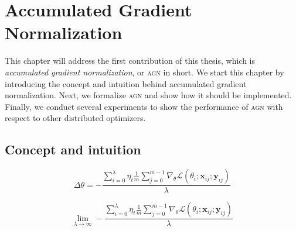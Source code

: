 %
%
%

\chapter{Accumulated Gradient Normalization}
\label{chapter:accumulated_gradient_normalization}

This chapter will address the first contribution of this thesis, which is \emph{accumulated gradient normalization}, or \textsc{agn} in short. We start this chapter by introducing the concept and intuition behind accumulated gradient normalization. Next, we formalize \textsc{agn} and show how it should be implemented. Finally, we conduct several experiments to show the performance of \textsc{agn} with respect to other distributed optimizers.

\section{Concept and intuition}
\label{sec:agn_concept}

\begin{equation}
  \label{eq:accumulated_gradient_normalization}
  \Delta\theta = -\frac{\sum_{i = 0}^\lambda \eta_t \frac{1}{m}\sum_{j = 0}^{m - 1} \nabla_\theta \mathcal{L}(\theta_i;\textbf{x}_{ij};\textbf{y}_{ij})}{\lambda}
\end{equation}

\begin{equation}
  \lim_{\lambda \to \infty} -\frac{\sum_{i = 0}^\lambda \eta_t \frac{1}{m}\sum_{j = 0}^{m - 1} \nabla_\theta \mathcal{L}(\theta_i;\textbf{x}_{ij};\textbf{y}_{ij})}{\lambda}
\end{equation}
